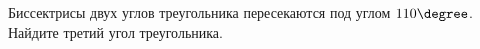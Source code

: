 \begin{ex}
	\begin{condition}
		Биссектрисы двух углов треугольника пересекаются под углом \( 110\degree \). Найдите третий угол треугольника.
	\end{condition}
\end{ex}